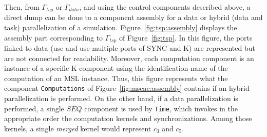 


Then, from $\Gamma_{tsp}$ or $\Gamma_{data}$, and using the control components described above,
a direct dump can be done to a component assembly for a data or hybrid (data
and task) parallelization of a simulation.
Figure~\ref{fig:tsp:assembly} displays the assembly part corresponding to
$\Gamma_{tsp}$ of Figure~\ref{fig:tsp}. In this figure, the ports
linked to data (use and use-multiple ports of SYNC and K) are
represented but are not connected for readability. Moreover, each computation
component is an instance of a specific K component using
the identification name of the computation of an MSL instance.
Thus, this figure represents what the component \texttt{Computations} of Figure~\ref{fig:mscac:assembly} contains if an hybrid parallelization is performed. On the other hand, if a data parallelization is performed, a single $SEQ$ component is used by \texttt{Time}, which invokes in the appropriate order the computation kernels and synchronizations. Among those kernels, a single \emph{merged} kernel would represent $c_3$ and $c_5$.

